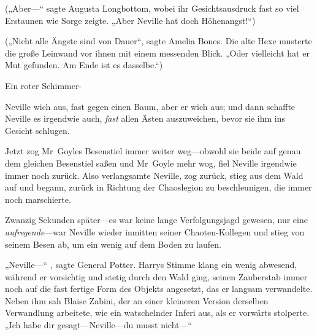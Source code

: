 („Aber—“ sagte Augusta Longbottom, wobei ihr Gesichtsausdruck fast so viel Erstaunen wie Sorge zeigte. „Aber Neville hat doch Höhenangst!“)

(„Nicht alle Ängste sind von Dauer“, sagte Amelia Bones. Die alte Hexe musterte die große Leinwand vor ihnen mit einem messenden Blick. „Oder vielleicht hat er Mut gefunden. Am Ende ist es dasselbe.“)

Ein roter Schimmer-

Neville wich aus, fast gegen einen Baum, aber er wich aus; und dann schaffte Neville es irgendwie auch, \emph{fast} allen Ästen auszuweichen, bevor sie ihm ins Gesicht schlugen.

Jetzt zog Mr~Goyles Besenstiel immer weiter weg—obwohl sie beide auf genau dem gleichen Besenstiel saßen und Mr~Goyle mehr wog, fiel Neville irgendwie immer noch zurück. Also verlangsamte Neville, zog zurück, stieg aus dem Wald auf und begann, zurück in Richtung der Chaoslegion zu beschleunigen, die immer noch marschierte.

Zwanzig Sekunden später—es war keine lange Verfolgungsjagd gewesen, nur eine \emph{aufregende}—war Neville wieder inmitten seiner Chaoten-Kollegen und stieg von seinem Besen ab, um ein wenig auf dem Boden zu laufen.

„Neville—“ , sagte General Potter. Harrys Stimme klang ein wenig abwesend, während er vorsichtig und stetig durch den Wald ging, seinen Zauberstab immer noch auf die fast fertige Form des Objekts angesetzt, das er langsam verwandelte. Neben ihm sah Blaise Zabini, der an einer kleineren Version derselben Verwandlung arbeitete, wie ein watschelnder Inferi aus, als er vorwärts stolperte. „Ich habe dir gesagt—Neville—du musst nicht—“

